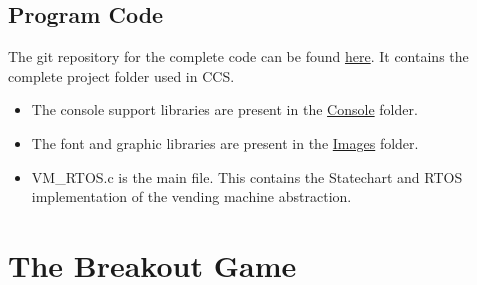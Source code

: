 \documentclass[a4paper,12pt,oneside]{book}
\begin{document}
\subsection{Program Code}
\qquad The git repository for the complete code can be found \href{https://github.com/eYSIP-2017/eYSIP-2017_Game_Development-TI-RTOS/tree/master/VendingMachine_Final}{here}. It contains the complete project folder used in CCS. 
\begin{itemize}
  \item The console support libraries are present in the \href{https://github.com/eYSIP-2017/eYSIP-2017_Game_Development-TI-RTOS/tree/master/VendingMachine_Final/Console}{Console} folder. 
  \item The font and graphic libraries are present in the \href{https://github.com/eYSIP-2017/eYSIP-2017_Game_Development-TI-RTOS/tree/master/VendingMachine_Final/Images}{Images} folder.
  \item VM\_RTOS.c is the main file. This contains the Statechart and RTOS implementation of the vending machine abstraction.
\end{itemize}
\section{The Breakout Game}
\end{document}
